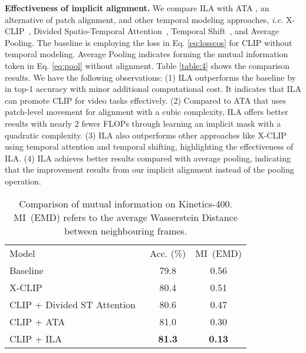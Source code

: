 \documentclass[10pt,twocolumn,letterpaper]{article}
\begin{document}
 \vspace{0.05in}
\noindent\textbf{Effectiveness of implicit alignment.} We compare ILA with ATA \cite{b28},  an alternative of patch alignment, and other temporal modeling approaches, \emph{i.e.} X-CLIP~\cite{b24}, Divided Spatio-Temporal Attention~\cite{b13}, Temporal Shift~\cite{b22}, and Average Pooling. The baseline is employing the loss in Eq. \eqref{eq:losscos} for CLIP without temporal modeling. Average Pooling indicates forming the mutual information token in Eq. \eqref{eq:pool} without alignment.
Table \ref{table:4} shows the comparison results.
We have the following observations: (1) ILA outperforms the baseline by  in top-1 accuracy with minor additional computational cost. It indicates that ILA can promote CLIP for video tasks effectively. 
(2) Compared to ATA that uses patch-level movement for alignment with a cubic complexity,  ILA offers better results with nearly 2 fewer FLOPs through learning an implicit mask with a quadratic complexity. 
(3) ILA also outperforms other approaches like X-CLIP using temporal attention and temporal shifting, highlighting the effectiveness of ILA. 
(4) ILA achieves better results compared with average pooling, indicating that the improvement results from our implicit alignment instead of the pooling operation.



\begin{table}[h!]\small
\caption{Comparison of mutual information on Kinetics-400. MI~(EMD) refers to the average Wasserstein Distance between neighbouring frames.}
\vspace{-0.1in}
\begin{center}
\renewcommand\arraystretch{1.2}
\begin{tabular}{lcc}
\toprule
Model          & Acc. (\%) & MI~(EMD) \\ 
\cmidrule(lr){1-1} \cmidrule(lr){2-2} \cmidrule(lr){3-3}
Baseline           & 79.8   & 0.56    \\
X-CLIP~\cite{b24}           & 80.4    & 0.51    \\
CLIP + Divided ST Attention~\cite{b13} & 80.6   & 0.47    \\
CLIP + ATA~\cite{b28}       & 81.0   & 0.30    \\
CLIP + ILA       & \textbf{81.3}   & \textbf{0.13}    \\ \bottomrule
\end{tabular}
\end{center}
\label{table:6}
\vspace{-0.2in}
\end{table}
\end{document}
